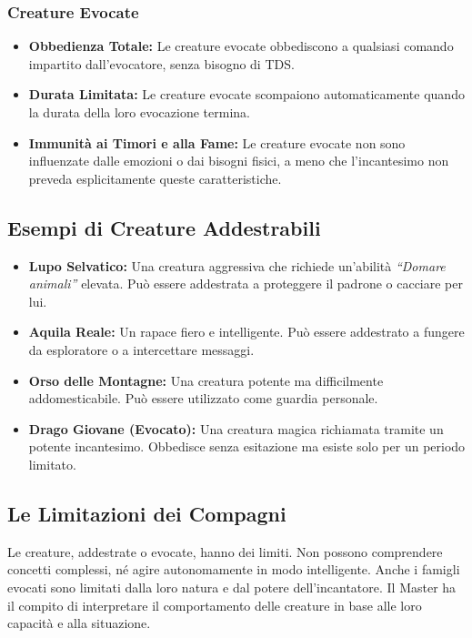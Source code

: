 \documentclass[../manuale_main.tex]{subfiles}
\begin{document}
\subsubsection{Creature Evocate}
\begin{itemize}
    \item \textbf{Obbedienza Totale:} Le creature evocate obbediscono a qualsiasi comando impartito dall'evocatore, senza bisogno di TDS.
    \item \textbf{Durata Limitata:} Le creature evocate scompaiono automaticamente quando la durata della loro evocazione termina.
    \item \textbf{Immunità ai Timori e alla Fame:} Le creature evocate non sono influenzate dalle emozioni o dai bisogni fisici, a meno che l'incantesimo non preveda esplicitamente queste caratteristiche.
\end{itemize}

\subsection{Esempi di Creature Addestrabili}

\begin{itemize}
    \item \textbf{Lupo Selvatico:} Una creatura aggressiva che richiede un'abilità \emph{``Domare animali''} elevata. Può essere addestrata a proteggere il padrone o cacciare per lui.
    \item \textbf{Aquila Reale:} Un rapace fiero e intelligente. Può essere addestrato a fungere da esploratore o a intercettare messaggi.
    \item \textbf{Orso delle Montagne:} Una creatura potente ma difficilmente addomesticabile. Può essere utilizzato come guardia personale.
    \item \textbf{Drago Giovane (Evocato):} Una creatura magica richiamata tramite un potente incantesimo. Obbedisce senza esitazione ma esiste solo per un periodo limitato.
\end{itemize}

\subsection{Le Limitazioni dei Compagni}
Le creature, addestrate o evocate, hanno dei limiti. Non possono comprendere concetti complessi, né agire autonomamente in modo intelligente. Anche i famigli evocati sono limitati dalla loro natura e dal potere dell'incantatore. Il Master ha il compito di interpretare il comportamento delle creature in base alle loro capacità e alla situazione.
\end{document}
